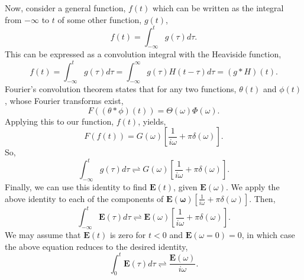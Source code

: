 \documentclass[12pt,twocolumn]{article}
\begin{document}
Now, consider a general function, $f(t)$ which can be written as the integral from $-\infty$ to $t$ of some other function, $g(t)$,
\begin{equation}
f(t)=\int_{-\infty}^{t}g(\tau)d\tau.
\end{equation}
This can be expressed as a convolution integral with the Heaviside function,
\begin{equation}
f(t)=\int_{-\infty}^{t}g(\tau)d\tau = \int_{-\infty}^{\infty}g(\tau)H(t-\tau)d\tau=(g*H)(t).
\end{equation}
Fourier's convolution theorem states that for any two functions, $\theta(t)$ and $\phi(t)$, whose Fourier transforms exist,
\begin{equation}
F((\theta*\phi)(t)) = \Theta(\omega)\Phi(\omega).
\end{equation}
Applying this to our function, $f(t)$, yields,
\begin{equation}
F(f(t)) = G(\omega)\left[\frac{1}{i\omega}+\pi\delta(\omega)\right].
\end{equation}
So,
\begin{equation}
\int_{-\infty}^{t}g(\tau)d\tau\rightleftharpoons G(\omega)\left[\frac{1}{i\omega}+\pi\delta(\omega)\right].
\end{equation}
Finally, we can use this identity to find $\mathbf{E}(t)$, given $\mathbf{E}(\omega)$. We apply the above identity to each of the components of $\mathbf{E(\omega)}\left[\frac{1}{i\omega}+\pi\delta(\omega)\right]$. Then,
\begin{equation}
\int_{-\infty}^{t}\mathbf{E}(\tau)d\tau\rightleftharpoons \mathbf{E}(\omega)\left[\frac{1}{i\omega}+\pi\delta(\omega)\right].
\end{equation}
We may assume that $\mathbf{E}(t)$ is zero for $t<0$ and $\mathbf{E}(\omega=0)=0$, in which case the above equation reduces to the desired identity,
\begin{equation}
\int_0^t\mathbf{E}(\tau)d\tau\rightleftharpoons \frac{\mathbf{E}(\omega)}{i\omega}.
\end{equation}
\newpage
\end{document}
